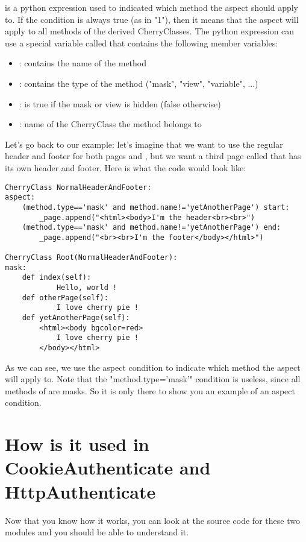 \documentclass{manual}
\begin{document}
 is a python expression used to indicated which method the aspect should apply to. If the condition
is always true (as in "1"), then it means that the aspect will apply to all methods of the derived CherryClasses. The
python expression can use a special variable called  that contains the following member variables:
\begin{itemize}
\item
{}: contains the name of the method
\item
{}: contains the type of the method ("mask", "view", "variable", ...)
\item
{}: is true if the mask or view is hidden (false otherwise)
\item
{}: name of the CherryClass the method belongs to
\end{itemize}

Let's go back to our example: let's imagine that we want to use the regular header and footer for both
pages  and , but we want a third page called  that has its own header
and footer.
Here is what the code would look like:
\begin{verbatim}
CherryClass NormalHeaderAndFooter:
aspect:
    (method.type=='mask' and method.name!='yetAnotherPage') start:
        _page.append("<html><body>I'm the header<br><br>")
    (method.type=='mask' and method.name!='yetAnotherPage') end:
        _page.append("<br><br>I'm the footer</body></html>")

CherryClass Root(NormalHeaderAndFooter):
mask:
    def index(self):
            Hello, world !
    def otherPage(self):
            I love cherry pie !
    def yetAnotherPage(self):
        <html><body bgcolor=red>
            I love cherry pie !
        </body></html>
\end{verbatim}
As we can see, we use the aspect condition to indicate which method the aspect will apply to. Note that
the "method.type='mask'" condition is useless, since all methods of  are masks. So it is
only there to show you an example of an aspect condition.

\section{How is it used in CookieAuthenticate and HttpAuthenticate}
Now that you know how it works, you can look at the source code for these two modules and you should be able to
understand it.
\end{document}
